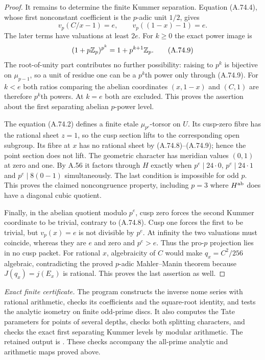 \begin{proof}
It remains to determine the finite Kummer separation.
Equation (A.74.4), whose first nonconstant
coefficient is the $p$-adic unit $1/2$, gives
\[
                v_p(C/x-1)=e,
                     \qquad v_p((1-x)-1)=e.
\tag{A.74.8}
\]
The later terms have valuations at least $2e$.
For $k\ge0$ the exact power image is
\[
                (1+p\mathbb Z_p)^{p^k}=1+p^{k+1}\mathbb Z_p.
\tag{A.74.9}
\]
The root-of-unity part contributes no further
possibility: raising to $p^k$ is bijective on
$\mu_{p-1}$, so a unit of residue one can be
a $p^k$th power only through (A.74.9).
For $k<e$ both ratios comparing the abelian
coordinates $(x,1-x)$ and $(C,1)$ are therefore
$p^k$th powers.  At $k=e$ both are excluded.
This proves the assertion about the first
separating abelian $p$-power level.

The equation (A.74.2) defines a finite etale
$\mu_{p^e}$-torsor on $U$.
Its cusp-zero fibre has the rational sheet $z=1$,
so the cusp section lifts to the corresponding
open subgroup.  Its fibre at $x$ has no rational
sheet by (A.74.8)--(A.74.9); hence the point
section does not lift.
The geometric character has meridian values
$(0,1)$ at zero and one.
By A.56 it factors through $H$ exactly when
$p^e\mid24\cdot0$, $p^e\mid24\cdot1$ and
$p^e\mid8(0-1)$ simultaneously.
The last condition is impossible for odd $p$.
This proves the claimed noncongruence property,
including $p=3$ where $H^{\rm ab}$ does have a
diagonal cubic quotient.

Finally, in the abelian quotient modulo $p^e$,
cusp zero forces the second Kummer coordinate
to be trivial, contrary to (A.74.8).
Cusp one forces the first to be trivial, but
$v_p(x)=e$ is not divisible by $p^e$.
At infinity the two valuations must coincide,
whereas they are $e$ and zero and $p^e>e$.
Thus the pro-$p$ projection lies in no cusp packet.
For rational $x$, algebraicity of $C$ would make
$q_x=C^2/256$ algebraic, contradicting the proved
$p$-adic Mahler--Manin theorem because
$J(q_x)=j(E_x)$ is rational.  This proves the
last assertion as well.
\end{proof}

\noindent\emph{Exact finite certificate.}
The program 
constructs the inverse nome series with rational arithmetic,
checks its coefficients and the square-root identity, and
tests the analytic isometry on finite odd-prime discs.
It also computes the Tate parameters for points of several
depths, checks both splitting characters, and checks the
exact first separating Kummer levels by modular arithmetic.
The retained output is
.
These checks accompany the all-prime analytic and arithmetic
maps proved above.
